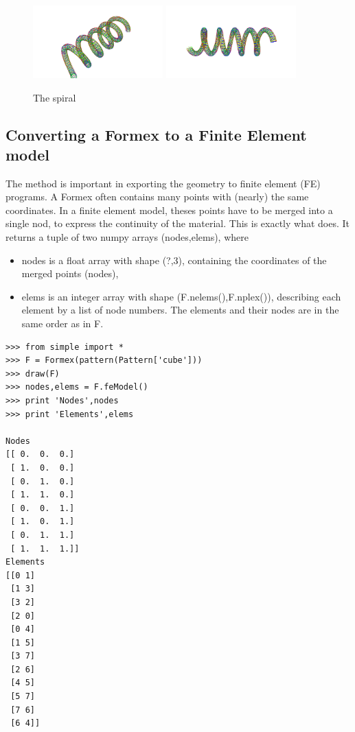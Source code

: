\begin{figure}[ht]
  \centering
  \begin{makeimage}
  \end{makeimage}
   \begin{latexonly}
     \includegraphics[width=5cm]{images/spiral-007}
     \includegraphics[width=5cm]{images/spiral-008}
   \end{latexonly}
   \begin{htmlonly}
   \end{htmlonly}  
   \caption{The spiral}
 \end{figure}


\subsection{Converting a Formex to a Finite Element model}
\label{subsec:femodel}

The  method is important in exporting the geometry to finite element (FE) programs. A Formex often contains many points with (nearly) the same coordinates. In a finite element model, theses points have to be merged into a single nod, to express the continuity of the material. This is exactly what does. It returns a tuple of two numpy arrays (nodes,elems), where
\begin{itemize}
\item nodes is a float array with shape (?,3), containing the coordinates of the merged points (nodes),
\item elems is an integer array with shape (F.nelems(),F.nplex()), describing each element by a list of node numbers. The elements and their nodes are in the same order as in F.
\end{itemize}

\begin{verbatim}
>>> from simple import *
>>> F = Formex(pattern(Pattern['cube']))
>>> draw(F)
>>> nodes,elems = F.feModel()
>>> print 'Nodes',nodes
>>> print 'Elements',elems

Nodes
[[ 0.  0.  0.]
 [ 1.  0.  0.]
 [ 0.  1.  0.]
 [ 1.  1.  0.]
 [ 0.  0.  1.]
 [ 1.  0.  1.]
 [ 0.  1.  1.]
 [ 1.  1.  1.]]
Elements
[[0 1]
 [1 3]
 [3 2]
 [2 0]
 [0 4]
 [1 5]
 [3 7]
 [2 6]
 [4 5]
 [5 7]
 [7 6]
 [6 4]]
\end{verbatim}

